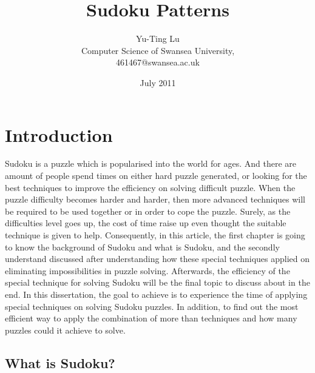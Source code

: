 \documentclass[11pt]{report}
\begin{document}
\title{Sudoku Patterns}
\author{Yu-Ting Lu\\
 Computer Science of Swansea University,\\
 461467@swansea.ac.uk}
\date{July 2011}
\maketitle

\tableofcontents



\chapter{Introduction}
\label{cha:Introduction}


Sudoku is a puzzle which is popularised into the world for ages. And there are amount of people spend times on either hard puzzle generated, or looking for the best techniques to improve the efficiency on solving difficult puzzle.
When the puzzle difficulty becomes harder and harder, then more advanced techniques will be required to be used together or in order to cope the puzzle. Surely, as the difficulties level goes up, the cost of time raise up even thought the suitable technique is given to help. Consequently, in this article, the first chapter is going to know the background of Sudoku and what is Sudoku, and the secondly understand discussed after understanding how these special techniques applied on eliminating impossibilities in puzzle solving. Afterwards, the efficiency of the special technique for solving Sudoku will be the final topic to discuss about in the end.
In this dissertation, the goal to achieve is to experience the time of applying special techniques on solving Sudoku puzzles. In addition, to find out the most efficient way to apply the combination of more than techniques and how many puzzles could it achieve to solve.


\section{What is Sudoku?}
\label{sec:whatissudoku}
\end{document}
